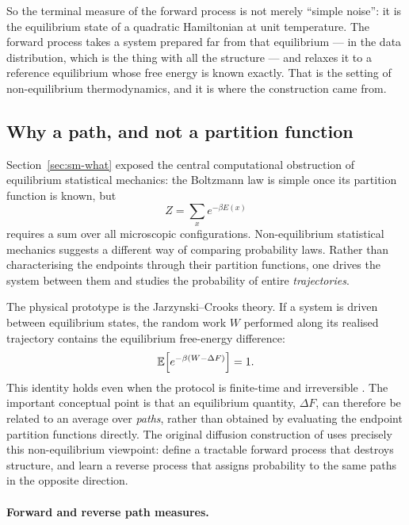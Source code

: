 So the terminal measure of the forward process is not merely ``simple noise'':
it is the equilibrium state of a quadratic Hamiltonian at unit temperature. The
forward process takes a system prepared far from that equilibrium --- in the
data distribution, which is the thing with all the structure --- and relaxes it
to a reference equilibrium whose free energy is known exactly. That is the
setting of non-equilibrium thermodynamics, and it is where the construction
came from.

\subsection{Why a path, and not a partition function}
\label{sec:sm-nonequilibrium}

Section~\ref{sec:sm-what} exposed the central computational obstruction of
equilibrium statistical mechanics: the Boltzmann law is simple once its
partition function is known, but
\[
  Z=\sum_x e^{-\beta E(x)}
\]
requires a sum over all microscopic configurations. Non-equilibrium statistical
mechanics suggests a different way of comparing probability laws. Rather than
characterising the endpoints through their partition functions, one drives the
system between them and studies the probability of entire \emph{trajectories}.

The physical prototype is the Jarzynski--Crooks theory. If a system is driven
between equilibrium states, the random work $W$ performed along its realised
trajectory contains the equilibrium free-energy difference:
\begin{equation}
  \mathbb{E}\!\left[e^{-\beta(W-\Delta F)}\right]=1.
  \label{eq:sm-jarzynski-physical}
\end{equation}
This identity holds even when the protocol is finite-time and irreversible
\citep{jarzynski1997nonequilibrium,crooks1999entropy}. The important conceptual
point is that an equilibrium quantity, $\Delta F$, can therefore be related to
an average over \emph{paths}, rather than obtained by evaluating the endpoint
partition functions directly. The original diffusion construction of
\citet{sohl2015deep} uses precisely this non-equilibrium viewpoint: define a
tractable forward process that destroys structure, and learn a reverse process
that assigns probability to the same paths in the opposite direction.

\paragraph{Forward and reverse path measures.}

